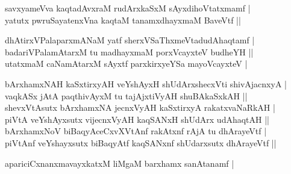 \begin{entry}
\medskip
\begin{shl}
savxyameVva kaqtadAvxraM rudArxkaSxM sAyxdihoVtatxmamf |\\[2pt]
yatutx pwruSayatenxVna kaqtaM tanamxdhayxmaM BaveVtf ||\\[-1pt]
\end{shl}
\medskip
{}
\smallskip
{}
\medskip
\begin{shl}
dhAtirxVPalaparxmANaM yatf sherxVSaThxmeVtadudAhaqtamf |\\[2pt]
badariVPalamAtarxM tu madhayxmaM porxVcayxteV budheYH ||\\[2pt]
utatxmaM caNamAtarxM sAyxtf parxkirxyeYSa mayoVcayxteV |\\[-1pt]
\end{shl}
\medskip
{}
\smallskip
{}
\medskip
\begin{shl}
bArxhamxNAH kaSxtirxyAH veYshAyxH shUdArxshecxVti shivAjacnxyA |\\[2pt]
vaqkASx jAtA paqthivAyxM tu tajAjxtiVyAH shuBAkaSxkAH ||\\[2pt]
shevxVtAsutx bArxhamxNA jecnxVyAH kaSxtirxyA rakatxvaNaRkAH |\\[2pt]
piVtA veYshAyxsutx vijecnxVyAH kaqSANxH shUdArx udAhaqtAH ||\\[2pt]
bArxhamxNoV biBaqyAceCxvXVtAnf rakAtxnf rAjA tu dhArayeVtf |\\[2pt]
piVtAnf veYshayxsutx biBaqyAtf kaqSANxnf shUdarxsutx dhArayeVtf ||\\[-1pt]
\end{shl}
\medskip
{}
\smallskip
{}
\medskip
\begin{shl}
apariciCxnanxmavayxkatxM liMgaM barxhamx sanAtanamf |\\[-1pt]
\end{shl}

\end{entry}
